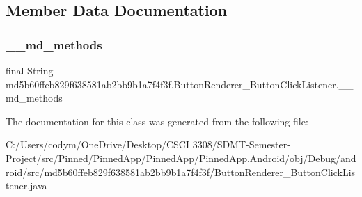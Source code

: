 \subsection{Member Data Documentation}
\mbox{\label{classmd5b60ffeb829f638581ab2bb9b1a7f4f3f_1_1_button_renderer___button_click_listener_a0ba3db9168a35b7cd52aeb7a3d5cbf30}} 
\subsubsection{\texorpdfstring{\+\_\+\+\_\+md\+\_\+methods}{\_\_md\_methods}}
{\footnotesize\ttfamily final String md5b60ffeb829f638581ab2bb9b1a7f4f3f.\+Button\+Renderer\+\_\+\+Button\+Click\+Listener.\+\_\+\+\_\+md\+\_\+methods\hspace{0.3cm}{\ttfamily [static]}}



The documentation for this class was generated from the following file\+:\begin{DoxyCompactItemize}
\item 
C\+:/\+Users/codym/\+One\+Drive/\+Desktop/\+C\+S\+C\+I 3308/\+S\+D\+M\+T-\/\+Semester-\/\+Project/src/\+Pinned/\+Pinned\+App/\+Pinned\+App/\+Pinned\+App.\+Android/obj/\+Debug/android/src/md5b60ffeb829f638581ab2bb9b1a7f4f3f/Button\+Renderer\+\_\+\+Button\+Click\+Listener.\+java\end{DoxyCompactItemize}
